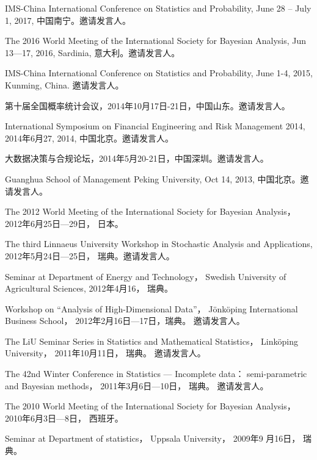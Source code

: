 \documentclass[twoside,a4paper,11pt]{article}
\begin{document}
\begin{etaremune}[itemsep=0ex,parsep=0pt]
\item IMS-China International Conference on Statistics and Probability, June 28 – July 1,
  2017, 中国南宁。邀请发言人。


\item The 2016 World Meeting of the International Society for Bayesian Analysis, Jun
  13—17, 2016, Sardinia, 意大利。邀请发言人。

\item IMS-China International Conference on Statistics and Probability, June 1-4, 2015,
  Kunming, China. 邀请发言人。

\item 第十届全国概率统计会议，2014年10月17日-21日，中国山东。邀请发言人。

\item International Symposium on Financial Engineering and Risk Management 2014, 2014年6月27,
  2014, 中国北京。邀请发言人。

\item 大数据决策与合规论坛，2014年5月20-21日，中国深圳。邀请发言人。

\item Guanghua School of Management Peking University, Oct 14, 2013, 中国北京。邀请发言人。

\item The 2012 World Meeting of the International Society for Bayesian
  Analysis， 2012年6月25日---29日， 日本。

\item The third Linnaeus University Workshop in Stochastic Analysis and
  Applications, 2012年5月24日---25日， 瑞典。邀请发言人。

\item Seminar at Department of Energy and Technology， Swedish
  University of Agricultural Sciences, 2012年4月16， 瑞典。

\item Workshop on ``Analysis of High-Dimensional Data''，
  Jönköping International Business School， 2012年2月16日---17日，瑞典。
  邀请发言人。

\item The LiU Seminar Series in Statistics and Mathematical Statistics，
  Linköping University， 2011年10月11日， 瑞典。 邀请发言人。

\item The 42nd Winter Conference in Statistics --- Incomplete data：
  semi-parametric and Bayesian methods， 2011年3月6日---10日，
  瑞典。 邀请发言人。

\item The 2010 World Meeting of the International Society for Bayesian
  Analysis， 2010年6月3日---8日， 西班牙。

\item Seminar at Department of statistics， Uppsala University， 2009年9
  月16日， 瑞典。

\end{etaremune}
\end{document}
